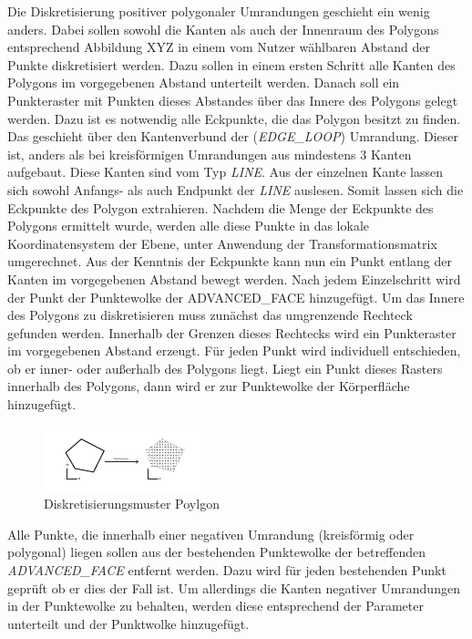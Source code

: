Die Diskretisierung positiver polygonaler Umrandungen geschieht ein wenig anders. Dabei sollen sowohl die Kanten als auch der Innenraum des Polygons entsprechend Abbildung XYZ in einem vom Nutzer wählbaren Abstand der Punkte  diskretisiert werden. Dazu sollen in einem ersten Schritt alle Kanten des Polygons im vorgegebenen Abstand unterteilt werden. Danach soll ein Punkteraster mit Punkten dieses Abstandes über das Innere des Polygons gelegt werden. Dazu ist es notwendig alle Eckpunkte, die das Polygon besitzt zu finden. Das geschieht über den Kantenverbund der (\textit{EDGE\_LOOP}) Umrandung. Dieser ist, anders als bei kreisförmigen Umrandungen aus mindestens 3 Kanten aufgebaut. Diese Kanten sind vom Typ \textit{LINE}. Aus der einzelnen Kante lassen sich sowohl Anfangs- als auch Endpunkt der \textit{LINE} auslesen. Somit lassen sich die Eckpunkte des Polygon extrahieren. Nachdem die Menge der Eckpunkte des Polygons ermittelt wurde, werden alle diese Punkte in das lokale Koordinatensystem der Ebene, unter Anwendung der Transformationsmatrix umgerechnet.
Aus der Kenntnis der Eckpunkte kann nun ein Punkt entlang der Kanten im vorgegebenen Abstand bewegt werden. Nach jedem Einzelschritt wird der Punkt der Punktewolke der ADVANCED\_FACE hinzugefügt. 
Um das Innere des Polygons zu diskretisieren muss zunächst das umgrenzende Rechteck gefunden werden. Innerhalb der Grenzen dieses Rechtecks wird ein Punkteraster im vorgegebenen Abstand erzeugt. Für jeden Punkt wird individuell entschieden, ob er inner- oder außerhalb des Polygons liegt. Liegt ein Punkt dieses Rasters innerhalb des Polygons, dann wird er zur Punktewolke der Körperfläche hinzugefügt.  

\begin{figure}[h]
	\centering
	
	\includegraphics[width=0.7\linewidth]{img/discretpolygon.pdf}
	
	\caption{Diskretisierungsmuster Poylgon}
	\label{fig:discretpolygon}
	
\end{figure}

Alle Punkte, die innerhalb einer negativen Umrandung (kreisförmig oder polygonal) liegen sollen aus der bestehenden Punktewolke der betreffenden \textit{ADVANCED\_FACE} entfernt werden. Dazu wird für jeden bestehenden Punkt geprüft ob er dies der Fall ist. Um allerdings die Kanten negativer Umrandungen in der Punktewolke zu behalten, werden diese entsprechend der Parameter unterteilt und der Punktwolke hinzugefügt.       








